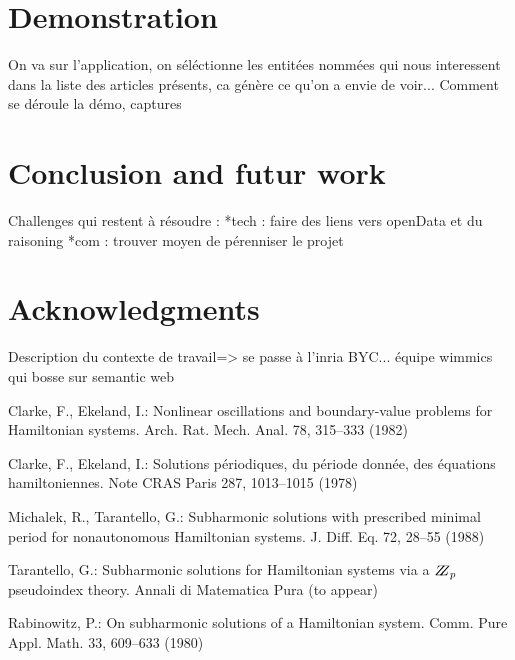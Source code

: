 \documentclass{llncs}
\begin{document}
\section{Demonstration}
%
On va sur l'application, on séléctionne les entitées nommées qui nous interessent dans la liste des articles présents, ca génère ce qu'on a envie de voir...
Comment se déroule la démo, captures
%

\section{Conclusion and futur work}
%
Challenges qui restent à résoudre :
	*tech : faire des liens vers openData et du raisoning
	*com : trouver moyen de pérenniser le projet
%

\section{Acknowledgments}
%
Description du contexte de travail=> se passe à l'inria BYC... équipe wimmics qui bosse sur semantic web

%





%
%
\begin{thebibliography}{5}
%
Clarke, F., Ekeland, I.:
Nonlinear oscillations and
boundary-value problems for Hamiltonian systems.
Arch. Rat. Mech. Anal. 78, 315--333 (1982)

Clarke, F., Ekeland, I.:
Solutions p\'{e}riodiques, du
p\'{e}riode donn\'{e}e, des \'{e}quations hamiltoniennes.
Note CRAS Paris 287, 1013--1015 (1978)

Michalek, R., Tarantello, G.:
Subharmonic solutions with prescribed minimal
period for nonautonomous Hamiltonian systems.
J. Diff. Eq. 72, 28--55 (1988)

Tarantello, G.:
Subharmonic solutions for Hamiltonian
systems via a $\bbbz_{p}$ pseudoindex theory.
Annali di Matematica Pura (to appear)

Rabinowitz, P.:
On subharmonic solutions of a Hamiltonian system.
Comm. Pure Appl. Math. 33, 609--633 (1980)

\end{thebibliography}

\clearpage
\end{document}
